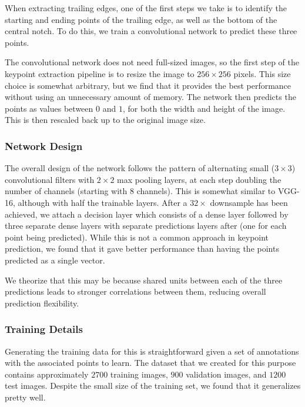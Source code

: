 When extracting trailing edges, one of the first steps we take is to identify the starting and ending points of the trailing edge, as well as the bottom of the central notch.
To do this, we train a convolutional network to predict these three points.

The convolutional network does not need full-sized images, so the first step of the keypoint extraction pipeline is to resize the image to $256 \times 256$ pixels.
This size choice is somewhat arbitrary, but we find that it provides the best performance without using an unnecessary amount of memory.
The network then predicts the points as values between $0$ and $1$, for both the width and height of the image. 
This is then rescaled back up to the original image size.


\subsubsection{Network Design}

The overall design of the network follows the pattern of alternating small ($3 \times 3$) convolutional filters with $2 \times 2$ max pooling layers, at each step doubling the number of channels (starting with $8$ channels).
This is somewhat similar to VGG-16, although with half the trainable layers.
After a $32\times$ downsample has been achieved, we attach a decision layer which consists of a dense layer followed by three separate dense layers with separate predictions layers after (one for each point being predicted).
While this is not a common approach in keypoint prediction, we found that it gave better performance than having the points predicted as a single vector.

We theorize that this may be because shared units between each of the three predictions leads to stronger correlations between them, reducing overall prediction flexibility.

\subsubsection{Training Details}

Generating the training data for this is straightforward given a set of annotations with the associated points to learn.
The dataset that we created for this purpose contains approximately $2700$ training images, $900$ validation images, and $1200$ test images.
Despite the small size of the training set, we found that it generalizes pretty well.

